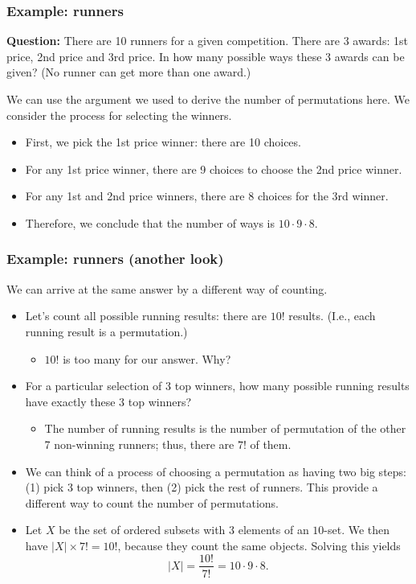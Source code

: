 \begin{frame}\frametitle{Example: runners}
  \begin{tcolorbox}
    {\bf Question:} There are 10 runners for a given competition.
    There are 3 awards: 1st price, 2nd price and 3rd price.  In how
    many possible ways these 3 awards can be given?  (No runner can
    get more than one award.)
  \end{tcolorbox}
  \pause

  We can use the argument we used to derive the number of permutations
  here.  We consider the process for selecting the winners. \pause
  
  \begin{itemize}
  \item First, we pick the 1st price winner: there are 10 choices. \pause
  \item For any 1st price winner, there are 9 choices to choose the
    2nd price winner. \pause
  \item For any 1st and 2nd price winners, there are 8 choices for the
    3rd winner. \pause
  \item Therefore, we conclude that the number of ways is $10\cdot
    9\cdot 8$.
  \end{itemize}
\end{frame}

\begin{frame}\frametitle{Example: runners (another look)}
  We can arrive at the same answer by a different way of counting.
  
  \begin{itemize}
  \item Let's count all possible running results: there are $10!$
    results.  (I.e., each running result is a permutation.) \pause
    \begin{itemize}
    \item $10!$ is too many for our answer. Why? \pause
    \end{itemize}
  \item For a particular selection of 3 top winners, how many possible
    running results have exactly these 3 top winners? \pause
    \begin{itemize}
    \item The number of running results is the number of permutation
      of the other 7 non-winning runners; thus, there are $7!$ of
      them.
    \end{itemize}
  \item We can think of a process of choosing a permutation as having
    two big steps: (1) pick 3 top winners, then (2) pick the rest of
    runners.  This provide a different way to count the number of
    permutations.
    \pause
  \item Let $X$ be the set of ordered subsets with $3$ elements of an
    $10$-set.  We then have $|X|\times 7! = 10!$, because they count
    the same objects. \pause  Solving this yields
    \[ |X| = \frac{10!}{7!} = 10\cdot 9\cdot 8.\]
  \end{itemize}
\end{frame}


